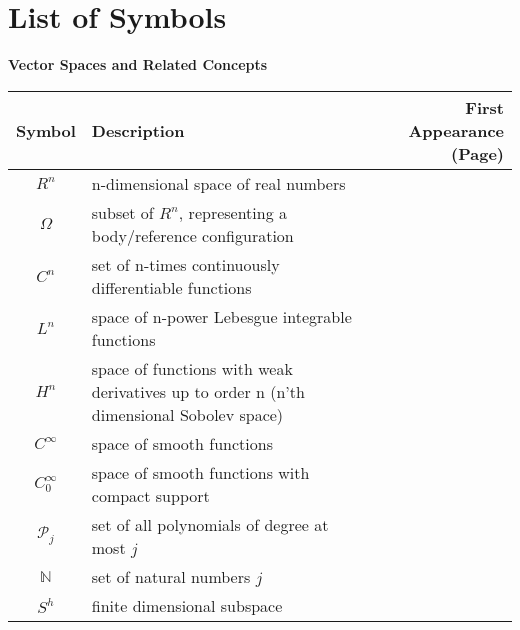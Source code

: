 \documentclass[main.tex]{subfiles}
\begin{document}
\chapter*{List of Symbols}

\noindent
\textbf{Vector Spaces and Related Concepts}\\
\begin{tabularx}{\textwidth}{cXr}
\toprule
Symbol & Description & First Appearance (Page) \\ 
\midrule
\( R^n \) & n-dimensional space of real numbers & \pageref{sym:Rn} \\
\( \Omega \) & subset of \( R^n \), representing a body/reference configuration & \pageref{sym:Omega} \\
\( C^n \) & set of n-times continuously differentiable functions & \pageref{sym:Cn} \\
\( L^n \) & space of n-power Lebesgue integrable functions & \pageref{sym:Ln} \\
\( H^n \) & space of functions with weak derivatives up to order n (n'th dimensional Sobolev space) & \pageref{sym:Hn} \\
\( C^\infty \) & space of smooth functions & \pageref{sym:Cinfty} \\
\( C^\infty_0 \) & space of smooth functions with compact support & \pageref{sym:Cinftyzero} \\
\( \mathcal{P}_j \) & set of all polynomials of degree at most \( j \) & \pageref{sym:poly} \\
\( \mathbb{N} \) & set of natural numbers \( j \) & \pageref{sym:natural} \\
\( S^h \) & finite dimensional subspace & \pageref{sym:Sh1} \\

\bottomrule
\end{tabularx}
\end{document}
